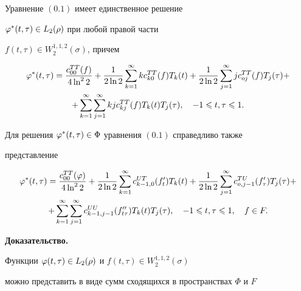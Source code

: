 \begin{thms}


Уравнение $(0.1)$ имеет единственное решение


$\varphi^*(t,\tau)\in L_2(\rho)$ при любой правой части


$f(t,\tau)\in W_2^{1,1,2}(\sigma)$, причем


\begin{multline}


\vp^*(t,\tau) = \frac{c_{00}^{TT}(f)}{4\ln^2 2} + \frac{1}{2\ln 2}


\sum_{k=1}^\infty k c_{k0}^{TT}(f)T_k(t) + 


\frac{1}{2\ln 2}\suml_{j=1}^{\infty} j c_{oj}^{TT}(f)T_j(\tau)+ \\


%


+\suml_{k=1}^\infty \suml_{j=1}^\infty kj c_{kj}^{TT}(f)


T_k(t) T_j(\tau), \quad -1\lea t,\tau \lea 1.


\end{multline}


Для решения $\varphi^*(t,\tau)\in \Phi$ уравнения $(0.1)$ справедливо также 


представление 


\begin{multline}


\vp^*(t,\tau) = \frac{c_{00}^{TT}(\vp)}{4\ln^2 2} +


\frac{1}{2\ln 2}\suml_{k=1}^\infty c_{k-1,0}^{UT}(f'_t)T_k(t) + 


\frac{1}{2\ln 2}\suml_{j=1}^\infty c_{o,j-1}^{TU}(f'_\tau)T_j(\tau) + \\


%


+\suml_{k=1}^\infty\suml_{j=1}^\infty c_{k-1,j-1}^{UU}


(f''_{t\tau})T_k(t)T_j(\tau),\quad -1\lea t,\tau\lea 1,\quad f\in F.


\end{multline}


\end{thms}








{\bf Доказательство.}


Функции $\varphi(t,\tau)\in L_2(\rho)$ и $f(t,\tau)\in W_2^{1,1,2}(\sigma)$ 


можно представить в виде сумм сходящихся в пространствах $\Phi$ и $F$ 


